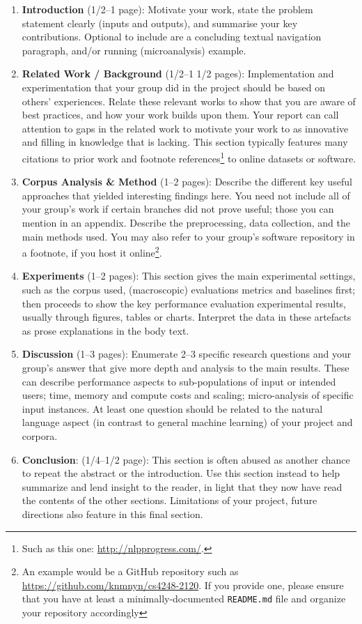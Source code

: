 \documentclass[11pt]{article}
\begin{document}
\begin{enumerate}
    \item {\bf Introduction} (1/2--1 page): Motivate your work, state the problem statement clearly (inputs and outputs), and summarise your key contributions.  Optional to include are a concluding textual navigation paragraph, and/or running (microanalysis) example. 
    \item {\bf Related Work / Background} (1/2--1 1/2 pages): Implementation and experimentation that your group did in the project should be based on others' experiences.  Relate these relevant works to show that you are aware of best practices, and how your work builds upon them.  Your report can call attention to gaps in the related work to motivate your work to as innovative and filling in knowledge that is lacking.  This section typically features many citations to prior work and footnote references\footnote{Such as this one: \url{http://nlpprogress.com/}.} to online datasets or software.
    \item {\bf Corpus Analysis \& Method} (1--2 pages): Describe the different key useful approaches that yielded interesting findings here.  You need not include all of your group's work if certain branches did not prove useful; those you can mention in an appendix.  Describe the preprocessing, data collection, and the main methods used. You may also refer to your group's software repository in a footnote, if you host it online\footnote{An example would be a GitHub repository such as \url{https://github.com/knmnyn/cs4248-2120}. If you provide one, please ensure that you have at least a minimally-documented {\tt README.md} file and organize your repository accordingly}. 
    \item {\bf Experiments} (1--2 pages): This section gives the main experimental settings, such as the corpus used, (macroscopic) evaluations metrics and baselines first; then proceeds to show the key performance evaluation experimental results, usually through figures, tables or charts.  Interpret the data in these artefacts as prose explanations in the body text.
    \item {\bf Discussion} (1--3 pages): Enumerate 2--3 specific research questions and your group's answer that give more depth and analysis to the main results.  These can describe performance aspects to sub-populations of input or intended users; time, memory and compute costs and scaling; micro-analysis of specific input instances.  At least one question should be related to the natural language aspect (in contrast to general machine learning) of your project and corpora.
    \item {\bf Conclusion}: (1/4--1/2 page): This section is often abused as another chance to repeat the abstract or the introduction.  Use this section instead to help summarize and lend insight to the reader, in light that they now have read the contents of the other sections.  Limitations of your project, future directions also feature in this final section.
\end{enumerate}
\end{document}
